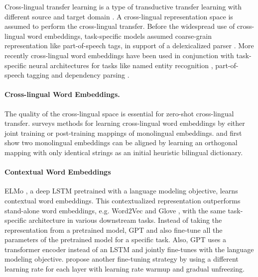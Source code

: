 \documentclass[11pt,a4paper]{article}
\begin{document}
Cross-lingual transfer learning is a type of transductive transfer learning with different source and target domain \citep{pan2010survey}. A cross-lingual representation space is assumed to perform the cross-lingual transfer. Before the widespread use of cross-lingual word embeddings, task-specific models assumed coarse-grain representation like part-of-speech tags, in support of a delexicalized parser \cite{zeman-resnik-2008-cross}. More recently cross-lingual word embeddings have been used in conjunction with task-specific neural architectures for tasks like named entity recognition \cite{xie-etal-2018-neural}, part-of-speech tagging \cite{kim-etal-2017-cross} and dependency parsing \cite{ahmad-etal-2019-difficulties}.

\paragraph{Cross-lingual Word Embeddings.}
The quality of the cross-lingual space is essential for zero-shot cross-lingual transfer.  surveys methods for learning cross-lingual word embeddings by either joint training or post-training mappings of monolingual embeddings.
 and  first show two monolingual embeddings can be aligned by learning an orthogonal mapping with only identical strings as an initial heuristic bilingual dictionary.

\paragraph{Contextual Word Embeddings}
ELMo \cite{peters-etal-2018-deep}, a deep LSTM \cite{hochreiter1997long} pretrained with a language modeling objective, learns contextual word embeddings. This contextualized representation outperforms stand-alone word embeddings, e.g. Word2Vec \cite{mikolov2013distributed} and Glove \cite{pennington-etal-2014-glove}, with the same task-specific architecture in various downstream tasks. Instead of taking the representation from a pretrained model, GPT \cite{radford2018improving} and  also fine-tune all the parameters of the pretrained model for a specific task. Also, GPT uses a transformer encoder \cite{vaswani2017attention} instead of an LSTM and jointly fine-tunes with the language modeling objective.  propose another fine-tuning strategy by using a different learning rate for each layer with learning rate warmup and gradual unfreezing.
\end{document}
